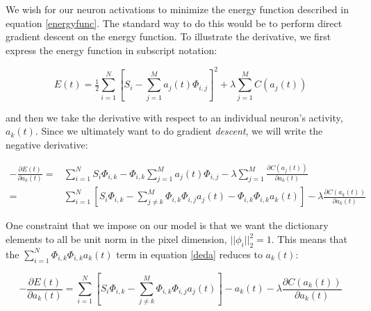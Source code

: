 We wish for our neuron activations to minimize the energy function described in equation \eqref{energyfunc}. The standard way to do this would be to perform direct gradient descent on the energy function. To illustrate the derivative, we first express the energy function in subscript notation:

\begin{equation}\label{indexenergyfunc}
    E(t) = \tfrac{1}{2} \sum\limits_{i=1}^{N} \left[ S_{i} - \sum\limits_{j=1}^{M}a_{j}(t) \Phi_{i,j} \right]^{2} + \lambda \sum\limits_{j=1}^{M} C(a_{j}(t))
\end{equation}

and then we take the derivative with respect to an individual neuron's activity, $a_{k}(t)$. Since we ultimately want to do gradient \textit{descent}, we will write the negative derivative:

\begin{align}\label{deda}
    - \frac{\partial E(t)}{\partial a_{k}(t)}
    =
        &\sum\limits_{i=1}^{N} S_{i} \Phi_{i,k} -
        \Phi_{i,k}\sum\limits_{j=1}^{M}a_{j}(t) \Phi_{i,j} -
        \lambda \sum\limits_{j=1}^{M}\frac{\partial C(a_{j}(t))}{\partial a_{k}(t)} \\
    =
        &\sum\limits_{i=1}^{N} \left[ S_{i} \Phi_{i,k} -
        \sum\limits_{j \neq k}^{M} \Phi_{i,k} \Phi_{i,j} a_{j}(t) - \Phi_{i,k}\Phi_{i,k}a_{k}(t) \right] -
        \lambda \frac{\partial C(a_{k}(t))}{\partial a_{k}(t)}
\end{align}

One constraint that we impose on our model is that we want the dictionary elements to all be unit norm in the pixel dimension, $||\phi_{i}||_2^2 = 1$. This means that the $\sum_{i=1}^{N}\Phi_{i,k}\Phi_{i,k}a_{k}(t)$ term in equation \eqref{deda} reduces to $a_k(t)$:

\begin{equation}
    -\frac{\partial E(t)}{\partial a_{k}(t)} =
    \sum\limits_{i=1}^{N} \left[ S_{i} \Phi_{i,k} -
    \sum\limits_{j \neq k}^{M} \Phi_{i,k} \Phi_{i,j} a_{j}(t) \right] - a_{k}(t) -
    \lambda \frac{\partial C(a_{k}(t))}{\partial a_{k}(t)}
\label{dedasimple}
\end{equation}

